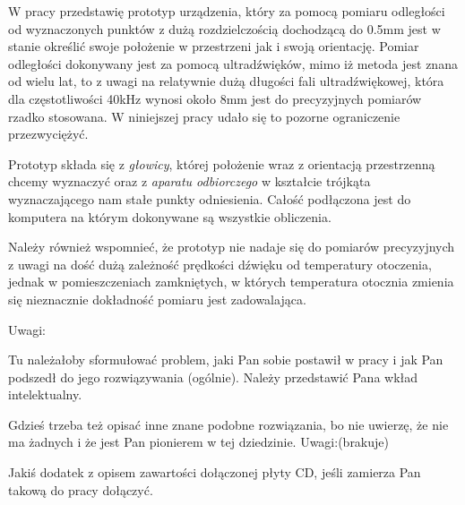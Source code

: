  W pracy przedstawię prototyp urządzenia, który za pomocą pomiaru odległości od wyznaczonych punktów
z dużą rozdzielczością dochodzącą do 0.5mm jest w stanie określić swoje położenie
w przestrzeni jak i swoją orientację. 
Pomiar odległości dokonywany jest za pomocą ultradźwięków,
mimo iż metoda jest znana od wielu lat, to z uwagi na relatywnie dużą długości fali ultradźwiękowej,
która dla częstotliwości 40kHz wynosi około 8mm jest do precyzyjnych pomiarów rzadko stosowana.
W niniejszej pracy udało się to pozorne ograniczenie przezwyciężyć.

Prototyp składa się z \textit{głowicy}, której położenie wraz z orientacją przestrzenną chcemy wyznaczyć
oraz z \textit{aparatu odbiorczego} w kształcie trójkąta wyznaczającego nam stałe punkty odniesienia.
Całość podłączona jest do komputera na którym dokonywane są wszystkie obliczenia.



Należy również wspomnieć, że prototyp nie nadaje się do pomiarów precyzyjnych 
z uwagi na 
dość dużą zależność prędkości dźwięku od temperatury otoczenia,
jednak w pomieszczeniach zamkniętych, w których temperatura otocznia zmienia się nieznacznie
dokładność pomiaru jest zadowalająca.


\newpage
Uwagi: 

Tu należałoby sformułować problem, jaki Pan sobie postawił w pracy i jak Pan podszedł do jego rozwiązywania (ogólnie). 
Należy przedstawić Pana wkład intelektualny.

Gdzieś trzeba też opisać inne znane podobne rozwiązania, bo nie uwierzę, że nie ma żadnych i że jest Pan pionierem w tej dziedzinie.
\newline
Uwagi:(brakuje)

Jakiś dodatek z opisem zawartości dołączonej płyty CD, jeśli zamierza Pan takową do pracy dołączyć.
   
